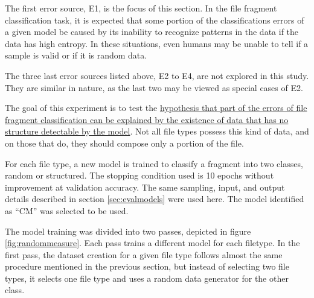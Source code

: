 The first error source, E1, is the focus of this section. In the file fragment classification task, it is expected that some portion of the classifications errors of a given model be caused by its inability to recognize patterns in the data if the data has high entropy. In these situations, even humans may be unable to tell if a sample is valid or if it is random data.

The three last error sources listed above, E2 to E4, are not explored in this study. They are similar in nature, as the last two may be viewed as special cases of E2. 

The goal of this experiment is to test the \underline{hypothesis that part of the errors of file fragment classification can be explained by the existence of data that has no structure detectable by the model}. Not all file types possess this kind of data, and on those that do, they should compose only a portion of the file.


For each file type, a new model is trained to classify a fragment into two classes, random or structured. The stopping condition used is 10 epochs without improvement at validation accuracy.
The same sampling, input, and output details described in section \ref{sec:evalmodels} were used here. The model identified as ``CM'' was selected to be used.


The model training was divided into two passes, depicted in figure \ref{fig:randommeasure}. Each pass trains a different model for each filetype. In the first pass, the dataset creation for a given file type follows almost the same procedure mentioned in the previous section, but instead of selecting two file types, it selects one file type and uses a random data generator for the other class.

